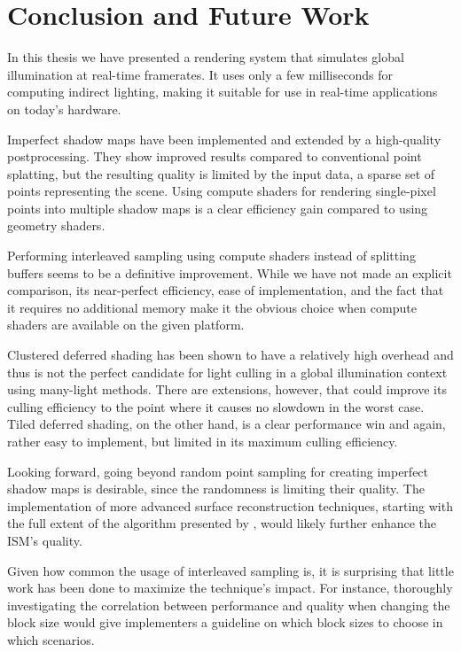 

\chapter{Conclusion and Future Work}
\label{chap:conclusion}

In this thesis we have presented a rendering system that simulates global illumination at real-time framerates. It uses only a few milliseconds for computing indirect lighting, making it suitable for use in real-time applications on today's hardware.

Imperfect shadow maps have been implemented and extended by a high-quality postprocessing. They show improved results compared to conventional point splatting, but the resulting quality is limited by the input data, a sparse set of points representing the scene. Using compute shaders for rendering single-pixel points into multiple shadow maps is a clear efficiency gain compared to using geometry shaders.

Performing interleaved sampling using compute shaders instead of splitting buffers seems to be a definitive improvement. While we have not made an explicit comparison, its near-perfect efficiency, ease of implementation, and the fact that it requires no additional memory make it the obvious choice when compute shaders are available on the given platform.

Clustered deferred shading has been shown to have a relatively high overhead and thus is not the perfect candidate for light culling in a global illumination context using many-light methods. There are extensions, however, that could improve its culling efficiency to the point where it causes no slowdown in the worst case. Tiled deferred shading, on the other hand, is a clear performance win and again, rather easy to implement, but limited in its maximum culling efficiency.


Looking forward, going beyond random point sampling for creating imperfect shadow maps is desirable, since the randomness is limiting their quality. The implementation of more advanced surface reconstruction techniques, starting with the full extent of the algorithm presented by \citet{Marroquim:2007:reconstruction}, would likely further enhance the ISM's quality.

Given how common the usage of interleaved sampling is, it is surprising that little work has been done to maximize the technique's impact. For instance, thoroughly investigating the correlation between performance and quality when changing the block size would give implementers a guideline on which block sizes to choose in which scenarios.

